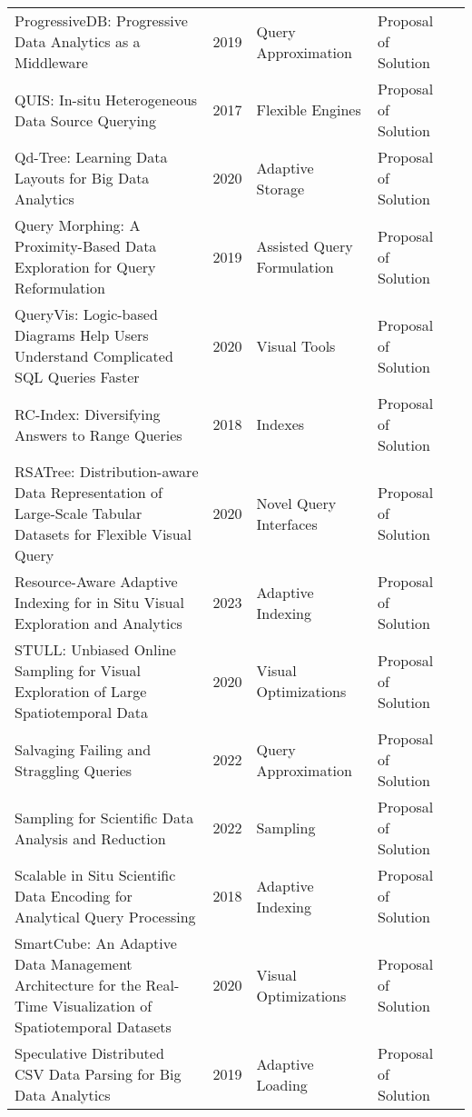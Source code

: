 \begin{longtable}{p{18em} l l l l}
{{ProgressiveDB}}: {{Progressive}} Data Analytics as a Middleware & 2019 & Query Approximation & Proposal of Solution & \cite{berg_progressivedb_2019}\\ 
{{QUIS}}: {{In-situ}} Heterogeneous Data Source Querying & 2017 & Flexible Engines & Proposal of Solution & \cite{chamanara_quis_2017}\\ 
Qd-Tree: {{Learning}} Data Layouts for Big Data Analytics & 2020 & Adaptive Storage & Proposal of Solution & \cite{yang_qdtree_2020}\\ 
Query {{Morphing}}: {{A Proximity-Based Data Exploration}} for {{Query Reformulation}} & 2019 & Assisted Query Formulation & Proposal of Solution & \cite{patel_query_2019}\\ 
{{QueryVis}}: {{Logic-based}} Diagrams Help Users Understand Complicated {{SQL}} Queries Faster & 2020 & Visual Tools & Proposal of Solution & \cite{leventidis_queryvis_2020}\\ 
{{RC-Index}}: {{Diversifying}} Answers to Range Queries & 2018 & Indexes & Proposal of Solution & \cite{wang_rcindex_2018}\\ 
{{RSATree}}: {{Distribution-aware}} Data Representation of Large-Scale Tabular Datasets for Flexible Visual Query & 2020 & Novel Query Interfaces & Proposal of Solution & \cite{mei_rsatree_2020}\\ 
Resource-Aware Adaptive Indexing for in Situ Visual Exploration and Analytics & 2023 & Adaptive Indexing & Proposal of Solution & \cite{maroulis_resourceaware_2023}\\ 
{{STULL}}: {{Unbiased}} Online Sampling for Visual Exploration of Large Spatiotemporal Data & 2020 & Visual Optimizations & Proposal of Solution & \cite{wang_stull_2020}\\ 
Salvaging Failing and Straggling Queries & 2022 & Query Approximation & Proposal of Solution & \cite{sundarmurthy_salvaging_2022}\\ 
Sampling for Scientific Data Analysis and Reduction & 2022 & Sampling & Proposal of Solution & \cite{biswas_sampling_2022}\\ 
Scalable in Situ Scientific Data Encoding for Analytical Query Processing & 2018 & Adaptive Indexing & Proposal of Solution & \cite{lakshminarasimhan_scalable_2018}\\ 
{{SmartCube}}: {{An}} Adaptive Data Management Architecture for the Real-Time Visualization of Spatiotemporal Datasets & 2020 & Visual Optimizations & Proposal of Solution & \cite{liu_smartcube_2020}\\ 
Speculative Distributed {{CSV}} Data Parsing for Big Data Analytics & 2019 & Adaptive Loading & Proposal of Solution & \cite{ge_speculative_2019}\\ 

\end{longtable}
